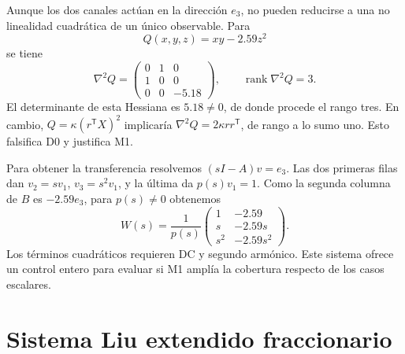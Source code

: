Aunque los dos canales actúan en la dirección \(e_3\), no pueden reducirse a
una no linealidad cuadrática de un único observable. Para
\[
 Q(x,y,z)=xy-2.59z^2
\]
se tiene
\begin{equation}
 \nabla^2Q=
 \begin{pmatrix}
 0&1&0\\1&0&0\\0&0&-5.18
 \end{pmatrix},
 \qquad \operatorname{rank}\nabla^2Q=3.
 \label{eq:cand-jerk-hessian}
\end{equation}
El determinante de esta Hessiana es \(5.18\ne0\), de donde procede el
rango tres. En cambio, \(Q=\kappa(r^{\mathsf T}X)^2\) implicaría
\(\nabla^2Q=2\kappa rr^{\mathsf T}\), de rango a lo sumo uno. Esto falsifica
D0 y justifica M1.

Para obtener la transferencia resolvemos \((sI-A)v=e_3\). Las dos
primeras filas dan \(v_2=sv_1\), \(v_3=s^2v_1\), y la última da
\(p(s)v_1=1\). Como la segunda columna de \(B\) es \(-2.59e_3\),
para \(p(s)\ne0\) obtenemos
\begin{equation}
 W(s)=\frac1{p(s)}
 \begin{pmatrix}
 1&-2.59\\
 s&-2.59s\\
 s^2&-2.59s^2
 \end{pmatrix}.
 \label{eq:cand-jerk-transfer}
\end{equation}
Los términos cuadráticos requieren DC y segundo armónico. Este sistema ofrece
un control entero para evaluar si M1 amplía la cobertura respecto de los casos
escalares.

\section{Sistema Liu extendido fraccionario}
\label{sec:cand-extended-liu}

